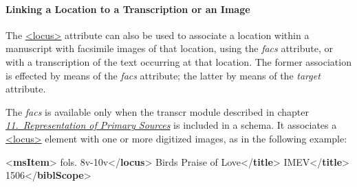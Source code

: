 \paragraph[{Linking a Location to a Transcription or an Image}]{Linking a Location to a Transcription or an Image}\par
The \hyperref[TEI.locus]{<locus>} attribute can also be used to associate a location within a manuscript with facsimile images of that location, using the {\itshape facs} attribute, or with a transcription of the text occurring at that location. The former association is effected by means of the {\itshape facs} attribute; the latter by means of the {\itshape target} attribute.\par
The {\itshape facs} is available only when the \textsf{transcr} module described in chapter \textit{\hyperref[PH]{11.\ Representation of Primary Sources}} is included in a schema. It associates a \hyperref[TEI.locus]{<locus>} element with one or more digitized images, as in the following example: \par\bgroup{}\exampleFont \begin{shaded}\noindent\mbox{}{<\textbf{msItem}>}\mbox{}\newline 
{}fols. 8v-10v{</\textbf{locus}>}\mbox{}\newline 
{}Birds Praise of Love{</\textbf{title}>}\mbox{}\newline 
{}\mbox{}\newline 
\hspace*{1em}IMEV{</\textbf{title}>}\mbox{}\newline 
\hspace*{1em}1506{</\textbf{biblScope}>}\mbox{}\newline 
{}\mbox{}\newline 

\end{shaded}

